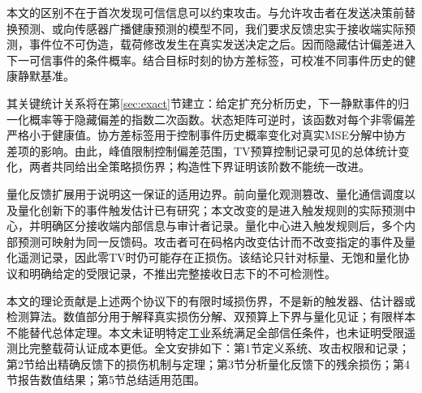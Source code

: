 本文的区别不在于首次发现可信信息可以约束攻击。与允许攻击者在发送决策前替换预测、或向传感器广播健康预测的模型\cite{song2022,xu2023,wei2026}不同，我们要求反馈忠实于接收端实际预测，事件位不可伪造，载荷修改发生在真实发送决定之后。因而隐藏估计偏差进入下一可信事件的条件概率。结合目标时刻的协方差标签，可校准不同事件历史的健康静默基准。

其关键统计关系将在第\ref{sec:exact}节建立：给定扩充分析历史，下一静默事件的归一化概率等于隐藏偏差的指数二次函数。状态矩阵可逆时，该函数对每个非零偏差严格小于健康值。协方差标签用于控制事件历史概率变化对真实MSE分解中协方差项的影响。由此，峰值限制控制偏差范围，TV预算控制记录可见的总体统计变化，两者共同给出全策略损伤界；构造性下界证明该阶数不能统一改进。

量化反馈扩展用于说明这一保证的适用边界。前向量化观测篡改、量化通信调度以及量化创新下的事件触发估计已有研究\cite{li2026,li2025,shen2025}；本文改变的是进入触发规则的实际预测中心，并明确区分接收端内部信息与审计者记录。量化中心进入触发规则后，多个内部预测可映射为同一反馈码。攻击者可在码格内改变估计而不改变指定的事件及量化遥测记录，因此零TV时仍可能存在正损伤。该结论只针对标量、无饱和量化协议和明确给定的受限记录，不推出完整接收日志下的不可检测性。

本文的理论贡献是上述两个协议下的有限时域损伤界，不是新的触发器、估计器或检测算法。数值部分用于解释真实损伤分解、双预算上下界与量化见证；有限样本不能替代总体定理。本文未证明特定工业系统满足全部信任条件，也未证明受限遥测比完整载荷认证成本更低。全文安排如下：第1节定义系统、攻击权限和记录；第2节给出精确反馈下的损伤机制与定理；第3节分析量化反馈下的残余损伤；第4节报告数值结果；第5节总结适用范围。
